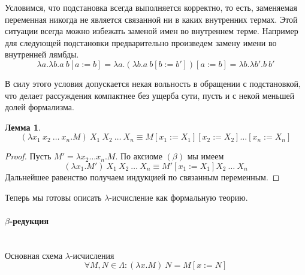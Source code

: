 \documentclass[lambda.tex]{subfiles}
\begin{document}
Условимся, что подстановка всегда выполняется корректно, то есть, заменяемая переменная никогда не является связанной ни в каких внутренних термах. Этой ситуации всегда можно избежать заменой имен во внутреннем терме. Например для следующей подстановки предварительно произведем замену имени во внутренней лямбды.
\[\lambda a.\lambda b.a\ b[a := b] = \lambda a.(\lambda b.a\ b[b := b'])[a := b] = \lambda b.\lambda b'.b\ b'\]

В силу этого условия допускается некая вольность в обращении с подстановкой, что делает рассуждения компактнее без ущерба сути, пусть и с некой меньшей долей формализма.

\newtheorem{lemma}{Лемма}

\begin{lemma}
\[(\lambda x_1 \ x_2 \ \dots\ x_n .M)\ X_1 \ X_2 \ \dots\ X_n \equiv M[x_1 := X_1 ][x_2 := X_2]\dots[x_n := X_n ]\]
\end{lemma}
\begin{proof}
Пусть $M' = \lambda x_2 \dots x_n .M$. По аксиоме $(\beta)$ мы имеем
\[(\lambda x_1 .M')\ X_1 \ X_2 \ \dots\ X_n \equiv M'[x_1 := X_1 ] X_2 \ \dots\ X_n\]
Дальнейшее равенство получаем индукцией по связанным переменным.
\end{proof}


Теперь мы готовы описать $\lambda$-исчисление как формальную теорию.\\

\paragraph{$\beta$-редукция} %
\label{par:beta reduction}
~\\
Основная схема $\lambda$-исчисления
\begin{equation*}
\forall M, N \in \Lambda : (\lambda x.M)\ N = M[x := N]\tag{$\beta$}
\end{equation*}
\end{document}
